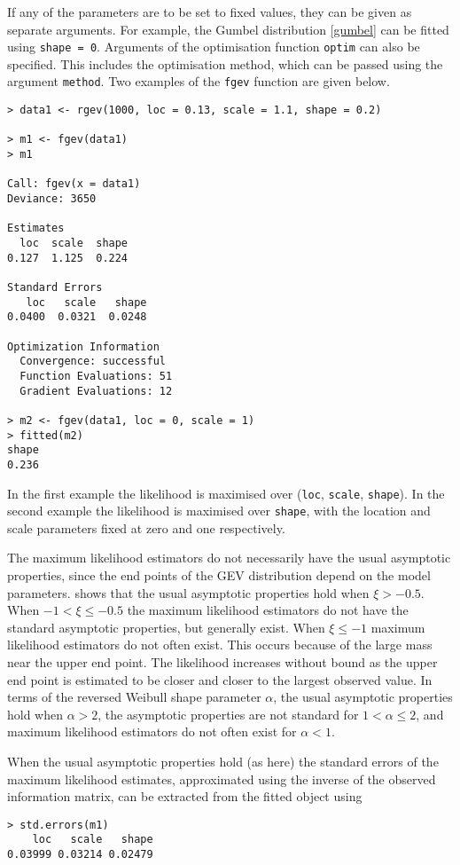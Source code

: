 \documentclass[11pt,a4paper]{article}
\begin{document}
If any of the parameters are to be set to fixed values, they can be given as separate arguments. 
For example, the Gumbel distribution \eqref{gumbel} can be fitted using \verb+shape = 0+.
Arguments of the optimisation function \verb+optim+ can also be specified.
This includes the optimisation method, which can be passed using the argument \verb+method+.
Two examples of the \verb+fgev+ function are given below.

\begin{verbatim}
> data1 <- rgev(1000, loc = 0.13, scale = 1.1, shape = 0.2)

> m1 <- fgev(data1)
> m1

Call: fgev(x = data1) 
Deviance: 3650 

Estimates
  loc  scale  shape  
0.127  1.125  0.224  

Standard Errors
   loc   scale   shape  
0.0400  0.0321  0.0248  

Optimization Information
  Convergence: successful 
  Function Evaluations: 51 
  Gradient Evaluations: 12 

> m2 <- fgev(data1, loc = 0, scale = 1)
> fitted(m2)
shape  
0.236  
\end{verbatim}
In the first example the likelihood is maximised over (\verb+loc+, \verb+scale+, \verb+shape+).
In the second example the likelihood is maximised over \verb+shape+, with the location and scale parameters fixed at zero and one respectively.

The maximum likelihood estimators do not necessarily have the usual asymptotic properties, since the end points of the GEV distribution depend on the model parameters. \citet{smit85} shows that the usual asymptotic properties hold when $\xi > -0.5$.
When $-1 < \xi \leq -0.5$ the maximum likelihood estimators do not have the standard asymptotic properties, but generally exist.
When $\xi \leq -1$ maximum likelihood estimators do not often exist.
This occurs because of the large mass near the upper end point. 
The likelihood increases without bound as the upper end point is estimated to be closer and closer to the largest observed value.
In terms of the reversed Weibull shape parameter $\alpha$, the usual asymptotic properties hold when $\alpha>2$, the asymptotic properties are not standard for $1<\alpha\leq2$, and maximum likelihood estimators do not often exist for $\alpha<1$.

When the usual asymptotic properties hold (as here) the standard errors of the maximum likelihood estimates, approximated using the inverse of the observed information matrix, can be extracted from the fitted object using
\begin{verbatim}
> std.errors(m1)
    loc   scale   shape 
0.03999 0.03214 0.02479 
\end{verbatim}
\end{document}
